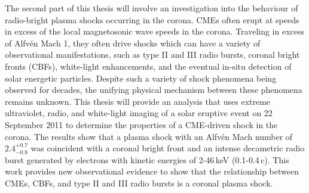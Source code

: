 \documentclass[11pt]{article}
\begin{document}
The second part of this thesis will involve an investigation into the behaviour of radio-bright plasma shocks occurring in the corona. CMEs often erupt at speeds in excess of the local magnetosonic wave speeds in the corona. Traveling in excess of Alfv\'{e}n Mach 1, they often drive shocks which can have a variety of observational manifestations, such as type II and III radio bursts, coronal bright fronts (CBFs), white-light enhancements, and the eventual in-situ detection of solar energetic particles. Despite such a variety of shock phenomena being observed for decades, the unifying physical mechanism between these phenomena remains unknown. This thesis will provide an analysis that uses extreme ultraviolet, radio, and white-light imaging of a solar eruptive event on 22 September 2011 to determine the properties of a CME-driven shock in the corona. The results show that a plasma shock with an Alfv\'{e}n Mach number of $2.4^{+0.7}_{-0.8}$ was coincident with a coronal bright front and an intense decametric radio burst generated by electrons with kinetic energies of 2-46\,keV (0.1-0.4\,c). This work provides new observational evidence to show that the relationship between CMEs, CBFs, and type II and III radio bursts is a coronal plasma shock. 
\end{document}
